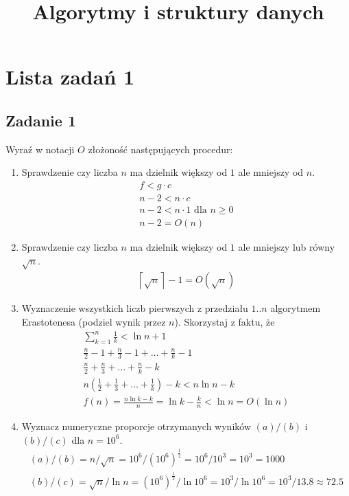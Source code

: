 \documentclass{article}
\begin{document}
\title{Algorytmy i struktury danych}
\author{}
\date{}
\maketitle

\section*{Lista zadań 1}
\subsection*{Zadanie 1}
Wyraź w notacji $O$ złożoność następujących procedur:
\begin{enumerate}[label=(\alph*)]
    \item Sprawdzenie czy liczba $n$ ma dzielnik większy od $1$ ale mniejszy od $n$.
          \begin{gather*}
              f < g \cdot c \\
              n-2 < n \cdot c \\
              n-2 < n \cdot 1 \text{ dla }n \geq 0 \\
              n-2 = O(n)
          \end{gather*}
    \item Sprawdzenie czy liczba $n$ ma dzielnik większy od $1$ ale mniejszy lub równy $\sqrt{n}$.
          \begin{gather*}
              \left \lceil {\sqrt{n}} \right \rceil - 1 = O(\sqrt{n})
          \end{gather*}
    \item Wyznaczenie wszystkich liczb pierwszych z przedziału $1..n$ algorytmem Erastotenesa
          (podziel wynik przez $n$). Skorzystaj z faktu, że
          \begin{gather*}
              \sum_{k=1}^{n} \frac{1}{k} < \ln n + 1 \\
              \frac{n}{2}-1 + \frac{n}{3}-1 + \dots + \frac{n}{k}-1 \\
              \frac{n}{2} + \frac{n}{3} + \dots + \frac{n}{k} - k \\
              n\left(\frac{1}{2} + \frac{1}{3} + \dots + \frac{1}{k}\right) - k < n \ln n - k \\
              f(n)=\frac{n \ln k - k}{n} = \ln k - \frac{k}{n} < \ln n = O(\ln n)
          \end{gather*}
    \item Wyznacz numeryczne proporcje otrzymanych wyników $(a)/(b)$ i $(b)/(c)$ dla $n = 10^6$.
          \begin{gather*}
              (a)/(b) = n/\sqrt{n} = 10^6/\left(10^6\right)^\frac{1}{2} = 10^6/10^3 = 10^3 = 1000 \\
              (b)/(c) = \sqrt{n}/\ln n = \left(10^6\right)^\frac{1}{2}/\ln 10^6 = 10^3/\ln 10^6 = 10^3/13.8 \approx 72.5
          \end{gather*}
\end{enumerate}
\end{document}
